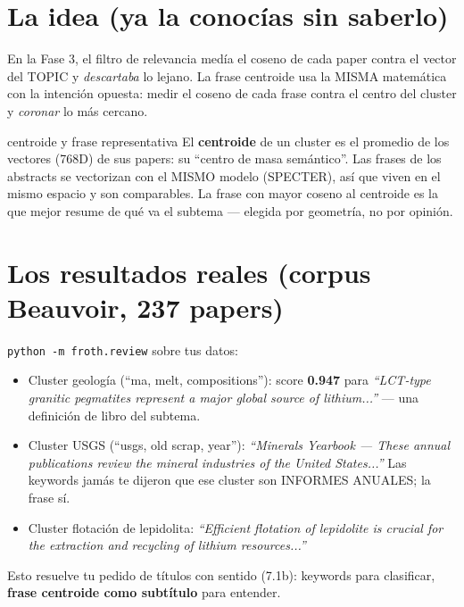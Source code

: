 \documentclass[11pt,a4paper]{article}
\begin{document}

\section{La idea (ya la conocías sin saberlo)}

En la Fase 3, el filtro de relevancia medía el coseno de cada paper contra el vector del
TOPIC y \emph{descartaba} lo lejano. La frase centroide usa la MISMA matemática con la
intención opuesta: medir el coseno de cada frase contra el centro del cluster y
\emph{coronar} lo más cercano.

\begin{concepto}{centroide y frase representativa}
El \textbf{centroide} de un cluster es el promedio de los vectores (768D) de sus papers:
su ``centro de masa semántico''. Las frases de los abstracts se vectorizan con el MISMO
modelo (SPECTER), así que viven en el mismo espacio y son comparables. La frase con mayor
coseno al centroide es la que mejor resume de qué va el subtema --- elegida por geometría,
no por opinión.
\end{concepto}

\section{Los resultados reales (corpus Beauvoir, 237 papers)}

\texttt{python -m froth.review} sobre tus datos:

\begin{itemize}
  \item Cluster geología (``ma, melt, compositions''): score \textbf{0.947} para
        \emph{``LCT-type granitic pegmatites represent a major global source of
        lithium...''} --- una definición de libro del subtema.
  \item Cluster USGS (``usgs, old scrap, year''): \emph{``Minerals Yearbook --- These
        annual publications review the mineral industries of the United States...''}
        Las keywords jamás te dijeron que ese cluster son INFORMES ANUALES; la frase sí.
  \item Cluster flotación de lepidolita: \emph{``Efficient flotation of lepidolite is
        crucial for the extraction and recycling of lithium resources...''}
\end{itemize}

Esto resuelve tu pedido de títulos con sentido (7.1b): keywords para clasificar,
\textbf{frase centroide como subtítulo} para entender.
\end{document}
